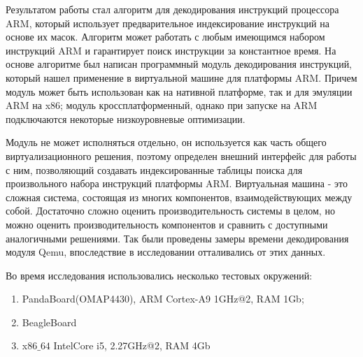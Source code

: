 
Результатом работы стал алгоритм для декодирования инструкций процессора ARM, который использует предварительное индексирование инструкций на основе их масок. Алгоритм может работать с любым имеющимся набором инструкций ARM и гарантирует поиск инструкции за константное время. На основе алгоритме был написан программный модуль декодирования инструкций, который нашел применение в виртуальной машине для платформы ARM. Причем модуль может быть использован как на нативной платформе, так и для эмуляции ARM на x86; модуль кроссплатформенный, однако при запуске на ARM подключаются некоторые низкоуровневые оптимизации. 

Модуль не может исполняться отдельно, он используется как часть общего виртуализационного решения, поэтому определен внешний интерфейс для работы с ним, позволяющий создавать индексированные таблицы поиска для произвольного набора инструкций платформы ARM. Виртуальная машина - это сложная система, состоящая из многих компонентов, взаимодействующих между собой. Достаточно сложно оценить производительность системы в целом, но можно оценить производительность компонентов и сравнить с доступными аналогичными решениями. Так были проведены замеры времени декодирования модуля Qemu, впоследствие в исследовании отталивались от этих данных.

Во время исследования использовались несколько тестовых окружений:

\begin{enumerate}
    \item PandaBoard(OMAP4430), ARM Cortex-A9 1GHz@2, RAM 1Gb;
    \item BeagleBoard
    \item x$86\_64$ IntelCore i5, 2.27GHz@2, RAM 4Gb
\end{enumerate}

